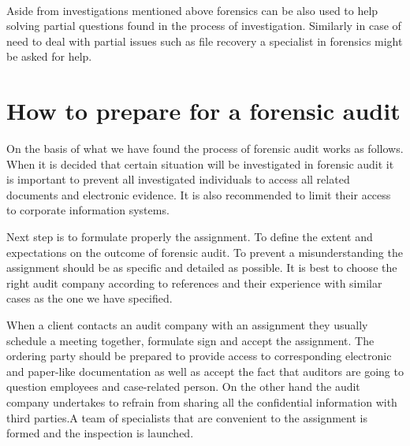 
\paragraph{} Aside from investigations mentioned above forensics can be also used to help solving partial questions found in the process of investigation. Similarly in case of need to deal with partial issues such as file recovery a specialist in forensics might be asked for help.




\section{How to prepare for a forensic audit}

On the basis of what we have found the process of forensic audit works as follows. When it is decided that certain situation will be investigated in forensic audit it is important to prevent all investigated individuals to access all related documents and electronic evidence. It is also recommended to limit their access to corporate information systems. 

Next step is to formulate properly the assignment. To define the extent and expectations on the outcome of forensic audit. To prevent a misunderstanding the assignment should be as specific and detailed as possible. It is best to choose the right audit company according to references and their experience with similar cases as the one we have specified.

When a client contacts an audit company with an assignment they usually schedule a meeting together, formulate sign and accept the assignment. The ordering party should be prepared to provide access to corresponding electronic and paper-like documentation as well as accept the fact that auditors are going to question employees and case-related person. On the other hand the audit company undertakes to refrain from sharing all the confidential information with third parties.A team of specialists that are convenient to the assignment is formed and the inspection is launched. 

